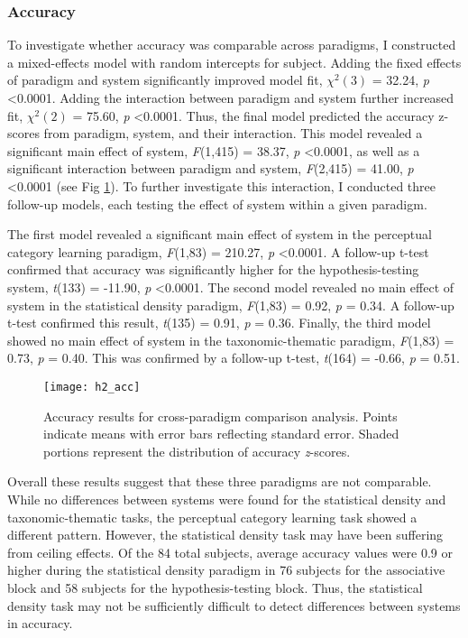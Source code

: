 \documentclass[../dissertation.tex]{subfiles}
\begin{document}
\subsubsection{Accuracy}
To investigate whether accuracy was comparable across paradigms, I constructed a mixed-effects model with random intercepts for subject. Adding the fixed effects of paradigm and system significantly improved model fit, $\chi^{2}(3)$ = 32.24, \textit{p} \textless 0.0001. Adding the interaction between paradigm and system further increased fit, $\chi^{2}(2)$ = 75.60, \textit{p} \textless 0.0001. Thus, the final model predicted the accuracy z-scores from paradigm, system, and their interaction. This model revealed a significant main effect of system, \textit{F}(1,415) = 38.37, \textit{p} \textless 0.0001, as well as a significant interaction between paradigm and system, \textit{F}(2,415) = 41.00, \textit{p} \textless 0.0001 (see Fig \ref{h2_acc}). To further investigate this interaction, I conducted three follow-up models, each testing the effect of system within a given paradigm. \par
	The first model revealed a significant main effect of system in the perceptual category learning paradigm, \textit{F}(1,83) = 210.27, \textit{p} \textless 0.0001. A follow-up t-test confirmed that accuracy was significantly higher for the hypothesis-testing system, \textit{t}(133) = -11.90, \textit{p} \textless 0.0001. The second model revealed no main effect of system in the statistical density paradigm, \textit{F}(1,83) = 0.92, \textit{p}  = 0.34. A follow-up t-test confirmed this result, \textit{t}(135) = 0.91, \textit{p}  = 0.36.  Finally, the third model showed no main effect of system in the taxonomic-thematic paradigm, \textit{F}(1,83) = 0.73, \textit{p}  = 0.40. This was confirmed by a follow-up t-test, \textit{t}(164) = -0.66, \textit{p}  = 0.51. \par
	
\begin{figure}[h]
\begin{center}
\texttt{[image: h2\_acc]}
\caption[Accuracy results for cross-paradigm comparison]{Accuracy results for cross-paradigm comparison analysis. Points indicate means with error bars reflecting standard error. Shaded portions represent the distribution of accuracy \textit{z}-scores.}
\vspace{-20pt}
\label{h2_acc}
\end{center}
\end{figure}	
	
	Overall these results suggest that these three paradigms are not comparable. While no differences between systems were found for the statistical density and taxonomic-thematic tasks, the perceptual category learning task showed a different pattern. However, the statistical density task may have been suffering from ceiling effects. Of the 84 total subjects, average accuracy values were 0.9 or higher during the statistical density paradigm in 76 subjects for the associative block and 58 subjects for the hypothesis-testing block. Thus, the statistical density task may not be sufficiently difficult to detect differences between systems in accuracy.
 \par
\end{document}
